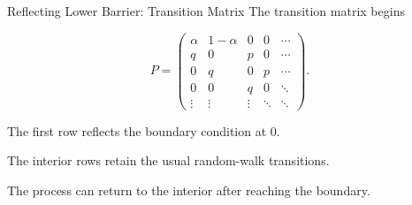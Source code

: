 \documentclass[
  ignorenonframetext,
  aspectratio=169,
]{beamer}
\begin{document}
\begin{frame}{Reflecting Lower Barrier: Transition Matrix}
\protect{}\label{reflecting-lower-barrier-transition-matrix}
The transition matrix begins

\[
P=
\begin{pmatrix}
\alpha&1-\alpha&0&0&\cdots\\
q&0&p&0&\cdots\\
0&q&0&p&\cdots\\
0&0&q&0&\ddots\\
\vdots&\vdots&\vdots&\ddots&\ddots
\end{pmatrix}.
\]

The first row reflects the boundary condition at \(0\).

The interior rows retain the usual random-walk transitions.

The process can return to the interior after reaching the boundary.
\end{frame}
\end{document}
